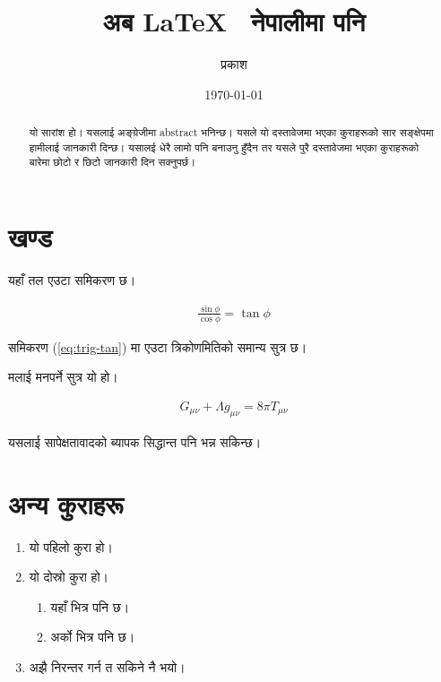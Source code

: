 \documentclass[a4paper]{article}
\title{अब \LaTeX ~ नेपालीमा पनि}
\date{\today}
\author{ प्रकाश}
\begin{document}
    \maketitle

    \begin{abstract}
        यो सारांश हो। यसलाई अङ्ग्रेजीमा abstract भनिन्छ। यसले यो दस्तावेजमा भएका कुराहरूको सार सङ्क्षेपमा हामीलाई जानकारी दिन्छ। यसालई धेरै लामो पनि बनाउनु हुँदैन तर यसले पुरै दस्तावेजमा भएका कुराहरूको बारेमा छोटो र छिटो जानकारी दिन सक्नुपर्छ।
    \end{abstract}

    \tableofcontents
    \section{खण्ड}
        यहाँ तल एउटा समिकरण छ।

        \begin{align} \label{eq:trig-tan}
            \frac{\sin{\phi}}{\cos{\phi}} = \tan{\phi}
        \end{align}
        
        समिकरण (\ref{eq:trig-tan}) मा एउटा त्रिकोणमितिको समान्य सुत्र छ।

        मलाई मनपर्ने सुत्र यो हो।

        \begin{align*}
            G_{\mu\nu} + \Lambda g_{\mu\nu} = 8\pi T_{\mu\nu}
        \end{align*}

        यसलाई सापेक्षतावादको ब्यापक सिद्धान्त पनि भन्न सकिन्छ।

    \section{अन्य कुराहरू}

        \begin{enumerate}
            \item यो पहिलो कुरा हो।
            \item यो दोस्रो कुरा हो।
            \begin{enumerate}
                \item यहाँ भित्र  पनि छ। 
                \item अर्को भित्र  पनि छ। 
            \end{enumerate}
            \item अझै निरन्तर गर्न त सकिने नै भयो।
        \end{enumerate}
\end{document}
